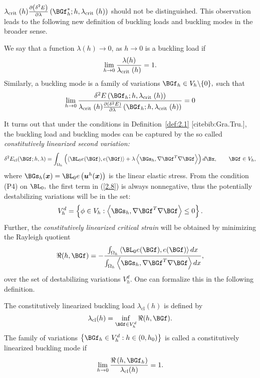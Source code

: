$\Gl_{\text {crit }}(h) \frac{\partial\left(\delta^{2} E\right)}{\partial \lambda}\left(\BGf_{h}^* ; h, \lambda_{\text {crit }}(h)\right)$ should not be distinguished. This observation leads to the following new definition of buckling loads and buckling modes in the broader sense. 
\begin{definition}
\label{def:2.2} 
We say that a function $\lambda(h) \rightarrow 0$, as $h \rightarrow 0$ is a buckling load if
$$
\lim _{h \rightarrow 0} \frac{\lambda(h)}{\lambda_{\text {crit }}(h)}=1.
$$
Similarly, a buckling mode is a family of variations $\BGf_{h} \in V_h \backslash\{0\},$ such that
$$
\lim _{h \rightarrow 0} \frac{\delta^{2} E\left(\BGf_{h} ; h, \Gl_{\text {crit }}(h)\right)}{\Gl_{\text {crit }}(h)\frac{\partial\left(\delta^{2} E\right)}{\partial \Gl}\left(\BGf_{h} ; h, \Gl_{\text {crit }}(h)\right)}=0
$$
\end{definition}
It turns out that under the conditions in Definition~\ref{def:2.1} [cite{bib:Gra.Tru.}], the buckling load and buckling modes can be captured by the so called \textit{constitutively linearized second variation:}
\begin{equation}
\label{2.8}
\delta^{2} E_{\mathrm{cl}}(\BGf ; h, \Gl)=\int_{\Omega_h}\left(\left \langle\BL_{0} e(\BGf), e(\BGf)\right\rangle+\lambda\left\langle\BGs_{h}, \nabla \BGf^{T} \nabla \BGf\right\rangle\right) d\Bx, \qquad \BGf \in V_h,
\end{equation}
where $\BGs_{h}(\boldsymbol{x})=\BL_{0} e\left(\boldsymbol{u}^{h}(\boldsymbol{x})\right)$ is the linear elastic stress.
From the condition (P4) on $\BL_0,$ the first term in (\ref{2.8}) is always nonnegative, thus the potentially destabilizing variations will be in the set: 
\begin{equation}
\label{2.9}
V_h^d=\left\{\phi \in V_h :\left\langle\BGs_h, \nabla \BGf^{T} \nabla \BGf\right\rangle\leq 0\right\}.
\end{equation}
Further, the \textit{constitutively linearized critical strain} will be obtained by minimizing the Rayleigh quotient
\begin{equation}
\label{2.10}
\Re(h, \BGf)=-\frac{\int_{\Omega_{h}}\left\langle \BL_{0} e(\BGf), e(\BGf)\right\rangle d x}{\int_{\Omega_{h}}\left\langle\BGs_{h}, \nabla \BGf^{T} \nabla\BGf \right\rangle d x},
\end{equation}
over the set of destabilizing variations $V_h^d.$ One can formalize this in the following definition.
\begin{definition}
\label{def:2.3}
The constitutively linearized buckling load $\lambda_{\mathrm{cl}}(h)$ is defined by
\begin{equation}
\label{2.11}
\lambda_{\mathrm{cl}}(h)=\inf _{\BGf \in V_h^d} \Re(h, \BGf).
\end{equation}
The family of variations $\left\{\BGf_{h} \in V_h^d: h \in\left(0, h_{0}\right)\right\}$ is called a constitutively linearized buckling mode if
\begin{equation}
\label{2.12}
\lim _{h \rightarrow 0} \frac{\Re\left(h, \BGf_{h}\right)}{\Gl_{\mathrm{cl}}(h)}=1.
\end{equation}
\end{definition}

